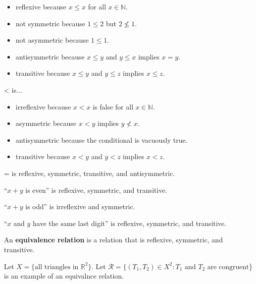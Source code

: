 \documentclass[a4paper]{article}
\begin{document}
\begin{itemize}
	\item reflexive because \( x\le x \) for all \( x \in \mathbb{N} \).
	\item not symmetric because \( 1 \le 2 \) but \( 2 \not\le 1 \).
	\item not asymmetric because \( 1 \le 1 \).
	\item antisymmetric because \( x \le y \) and \( y \le x \) implies \( x = y \).
	\item transitive because \( x \le y \) and \( y \le z \) implies \( x \le z \).
\end{itemize}

\begin{eg}
	< is...
\end{eg}

\begin{itemize}
	\item irreflexive because \( x < x \) is false for all \( x \in \mathbb{N} \).
	\item asymmetric because \( x < y \) implies \( y \not< x \).
	\item antisymmetric because the conditional is vacuously true.
	\item transitive because \( x < y \) and \( y < z \) implies \( x < z \).
\end{itemize}

\begin{eg}
	= is reflexive, symmetric, transitive, and antisymmetric.
\end{eg}

\begin{eg}
	``\( x + y \) is even'' is reflexive, symmetric, and transitive.
\end{eg}

\begin{eg}
	``\( x+y \) is odd'' is irreflexive and symmetric.
\end{eg}

\begin{eg}
	``\( x \) and \( y \) have the same last digit'' is reflexive, symmetric, and transitive.
\end{eg}

\begin{definition}
	An \textbf{equivalence relation} is a relation that is reflexive, symmetric, and transitive.
\end{definition}

\begin{eg}
	Let \( X=\{\text{all triangles in } \mathbb{R}^2\}   \). Let \( \mathcal{R} = \{(T_{1},T_{2})\in X^2 \colon T_{1} \text{ and } T_{2} \text{ are congruent}\)\} is an example of an equivalnce relation.
\end{eg}
\end{document}
